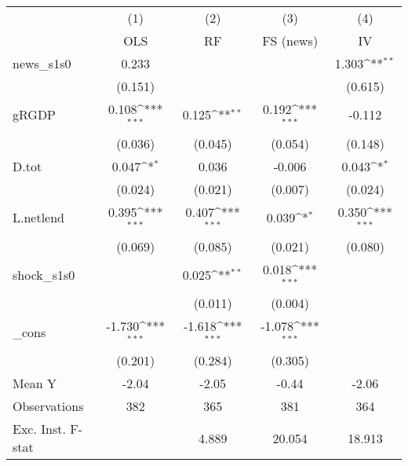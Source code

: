 {
\def\sym#1{\ifmmode^{#1}\else\(^{#1}\)\fi}
\begin{tabular}{l*{4}{c}}
\toprule
            &\multicolumn{1}{c}{(1)}&\multicolumn{1}{c}{(2)}&\multicolumn{1}{c}{(3)}&\multicolumn{1}{c}{(4)}\\
            &\multicolumn{1}{c}{OLS}&\multicolumn{1}{c}{RF}&\multicolumn{1}{c}{FS (news)}&\multicolumn{1}{c}{IV}\\
\midrule
news\_s1s0   &       0.233         &                     &                     &       1.303\sym{**} \\
            &     (0.151)         &                     &                     &     (0.615)         \\
\addlinespace
gRGDP       &       0.108\sym{***}&       0.125\sym{**} &       0.192\sym{***}&      -0.112         \\
            &     (0.036)         &     (0.045)         &     (0.054)         &     (0.148)         \\
\addlinespace
D.tot       &       0.047\sym{*}  &       0.036         &      -0.006         &       0.043\sym{*}  \\
            &     (0.024)         &     (0.021)         &     (0.007)         &     (0.024)         \\
\addlinespace
L.netlend   &       0.395\sym{***}&       0.407\sym{***}&       0.039\sym{*}  &       0.350\sym{***}\\
            &     (0.069)         &     (0.085)         &     (0.021)         &     (0.080)         \\
\addlinespace
shock\_s1s0  &                     &       0.025\sym{**} &       0.018\sym{***}&                     \\
            &                     &     (0.011)         &     (0.004)         &                     \\
\addlinespace
\_cons      &      -1.730\sym{***}&      -1.618\sym{***}&      -1.078\sym{***}&                     \\
            &     (0.201)         &     (0.284)         &     (0.305)         &                     \\
\midrule
Mean Y      &       -2.04         &       -2.05         &       -0.44         &       -2.06         \\
Observations&         382         &         365         &         381         &         364         \\
Exc. Inst. F-stat&                     &       4.889         &      20.054         &      18.913         \\
\bottomrule
\end{tabular}
}
